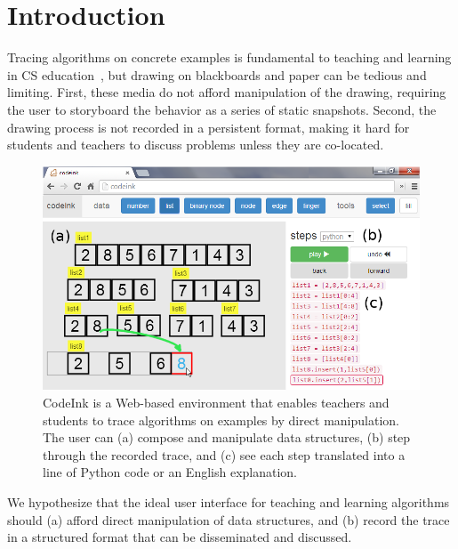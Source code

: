 \section{Introduction}

Tracing algorithms on concrete examples is fundamental to teaching and learning
in CS education~\cite{Lister2004}, but drawing on blackboards and paper can be
tedious and limiting. First, these media do not afford manipulation of the
drawing, requiring the user to storyboard the behavior as a series of static
snapshots. Second, the drawing process is not recorded in a persistent format,
making it hard for students and teachers to discuss problems unless they are
co-located.

\begin{figure}

\begin{center}
\includegraphics[width=\columnwidth]{img/frontpage-mergesort.png}
\end{center}

\caption{CodeInk is a Web-based environment that enables teachers and students
to trace algorithms on examples by direct manipulation. The user can (a) compose and
manipulate data structures, (b) step through the recorded trace, and (c) see
each step translated into a line of Python code or an English explanation.}

\label{fig:codeink-intro}
\end{figure}

We hypothesize that the ideal user interface for teaching and learning
algorithms should (a) afford direct manipulation of data structures, and (b)
record the trace in a structured format that can be disseminated and discussed.


